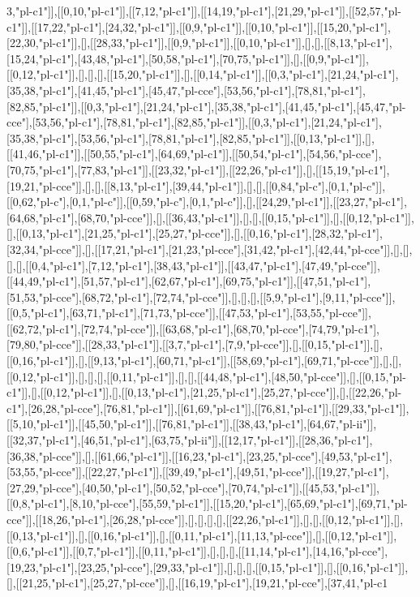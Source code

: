 3,"pl-c1"]],[[0,10,"pl-c1"]],[[7,12,"pl-c1"]],[[14,19,"pl-c1"],[21,29,"pl-c1"]],[[52,57,"pl-c1"]],[[17,22,"pl-c1"],[24,32,"pl-c1"]],[[0,9,"pl-c1"]],[[0,10,"pl-c1"]],[[15,20,"pl-c1"],[22,30,"pl-c1"]],[],[[28,33,"pl-c1"]],[[0,9,"pl-c1"]],[[0,10,"pl-c1"]],[],[],[[8,13,"pl-c1"],[15,24,"pl-c1"],[43,48,"pl-c1"],[50,58,"pl-c1"],[70,75,"pl-c1"]],[],[[0,9,"pl-c1"]],[[0,12,"pl-c1"]],[],[],[],[[15,20,"pl-c1"]],[],[[0,14,"pl-c1"]],[[0,3,"pl-c1"],[21,24,"pl-c1"],[35,38,"pl-c1"],[41,45,"pl-c1"],[45,47,"pl-cce"],[53,56,"pl-c1"],[78,81,"pl-c1"],[82,85,"pl-c1"]],[[0,3,"pl-c1"],[21,24,"pl-c1"],[35,38,"pl-c1"],[41,45,"pl-c1"],[45,47,"pl-cce"],[53,56,"pl-c1"],[78,81,"pl-c1"],[82,85,"pl-c1"]],[[0,3,"pl-c1"],[21,24,"pl-c1"],[35,38,"pl-c1"],[53,56,"pl-c1"],[78,81,"pl-c1"],[82,85,"pl-c1"]],[[0,13,"pl-c1"]],[],[[41,46,"pl-c1"]],[[50,55,"pl-c1"],[64,69,"pl-c1"]],[[50,54,"pl-c1"],[54,56,"pl-cce"],[70,75,"pl-c1"],[77,83,"pl-c1"]],[[23,32,"pl-c1"]],[[22,26,"pl-c1"]],[],[[15,19,"pl-c1"],[19,21,"pl-cce"]],[],[],[[8,13,"pl-c1"],[39,44,"pl-c1"]],[],[],[[0,84,"pl-c"],[0,1,"pl-c"]],[[0,62,"pl-c"],[0,1,"pl-c"]],[[0,59,"pl-c"],[0,1,"pl-c"]],[],[[24,29,"pl-c1"]],[[23,27,"pl-c1"],[64,68,"pl-c1"],[68,70,"pl-cce"]],[],[[36,43,"pl-c1"]],[],[],[[0,15,"pl-c1"]],[],[[0,12,"pl-c1"]],[],[[0,13,"pl-c1"],[21,25,"pl-c1"],[25,27,"pl-cce"]],[],[[0,16,"pl-c1"],[28,32,"pl-c1"],[32,34,"pl-cce"]],[],[[17,21,"pl-c1"],[21,23,"pl-cce"],[31,42,"pl-c1"],[42,44,"pl-cce"]],[],[],[],[],[[0,4,"pl-c1"],[7,12,"pl-c1"],[38,43,"pl-c1"]],[[43,47,"pl-c1"],[47,49,"pl-cce"]],[[44,49,"pl-c1"],[51,57,"pl-c1"],[62,67,"pl-c1"],[69,75,"pl-c1"]],[[47,51,"pl-c1"],[51,53,"pl-cce"],[68,72,"pl-c1"],[72,74,"pl-cce"]],[],[],[],[[5,9,"pl-c1"],[9,11,"pl-cce"]],[[0,5,"pl-c1"],[63,71,"pl-c1"],[71,73,"pl-cce"]],[[47,53,"pl-c1"],[53,55,"pl-cce"]],[[62,72,"pl-c1"],[72,74,"pl-cce"]],[[63,68,"pl-c1"],[68,70,"pl-cce"],[74,79,"pl-c1"],[79,80,"pl-cce"]],[[28,33,"pl-c1"]],[[3,7,"pl-c1"],[7,9,"pl-cce"]],[],[[0,15,"pl-c1"]],[],[[0,16,"pl-c1"]],[],[[9,13,"pl-c1"],[60,71,"pl-c1"]],[[58,69,"pl-c1"],[69,71,"pl-cce"]],[],[],[[0,12,"pl-c1"]],[],[],[],[[0,11,"pl-c1"]],[],[],[[44,48,"pl-c1"],[48,50,"pl-cce"]],[],[[0,15,"pl-c1"]],[],[[0,12,"pl-c1"]],[],[[0,13,"pl-c1"],[21,25,"pl-c1"],[25,27,"pl-cce"]],[],[[22,26,"pl-c1"],[26,28,"pl-cce"],[76,81,"pl-c1"]],[[61,69,"pl-c1"]],[[76,81,"pl-c1"]],[[29,33,"pl-c1"]],[[5,10,"pl-c1"]],[[45,50,"pl-c1"]],[[76,81,"pl-c1"]],[[38,43,"pl-c1"],[64,67,"pl-ii"]],[[32,37,"pl-c1"],[46,51,"pl-c1"],[63,75,"pl-ii"]],[[12,17,"pl-c1"]],[[28,36,"pl-c1"],[36,38,"pl-cce"]],[],[[61,66,"pl-c1"]],[[16,23,"pl-c1"],[23,25,"pl-cce"],[49,53,"pl-c1"],[53,55,"pl-cce"]],[[22,27,"pl-c1"]],[[39,49,"pl-c1"],[49,51,"pl-cce"]],[[19,27,"pl-c1"],[27,29,"pl-cce"],[40,50,"pl-c1"],[50,52,"pl-cce"],[70,74,"pl-c1"]],[[45,53,"pl-c1"]],[[0,8,"pl-c1"],[8,10,"pl-cce"],[55,59,"pl-c1"]],[[15,20,"pl-c1"],[65,69,"pl-c1"],[69,71,"pl-cce"]],[[18,26,"pl-c1"],[26,28,"pl-cce"]],[],[],[],[],[[22,26,"pl-c1"]],[],[],[[0,12,"pl-c1"]],[],[[0,13,"pl-c1"]],[],[[0,16,"pl-c1"]],[],[[0,11,"pl-c1"],[11,13,"pl-cce"]],[],[[0,12,"pl-c1"]],[[0,6,"pl-c1"]],[[0,7,"pl-c1"]],[[0,11,"pl-c1"]],[],[],[],[[11,14,"pl-c1"],[14,16,"pl-cce"],[19,23,"pl-c1"],[23,25,"pl-cce"],[29,33,"pl-c1"]],[],[],[],[[0,15,"pl-c1"]],[],[[0,16,"pl-c1"]],[],[[21,25,"pl-c1"],[25,27,"pl-cce"]],[],[[16,19,"pl-c1"],[19,21,"pl-cce"],[37,41,"pl-c1